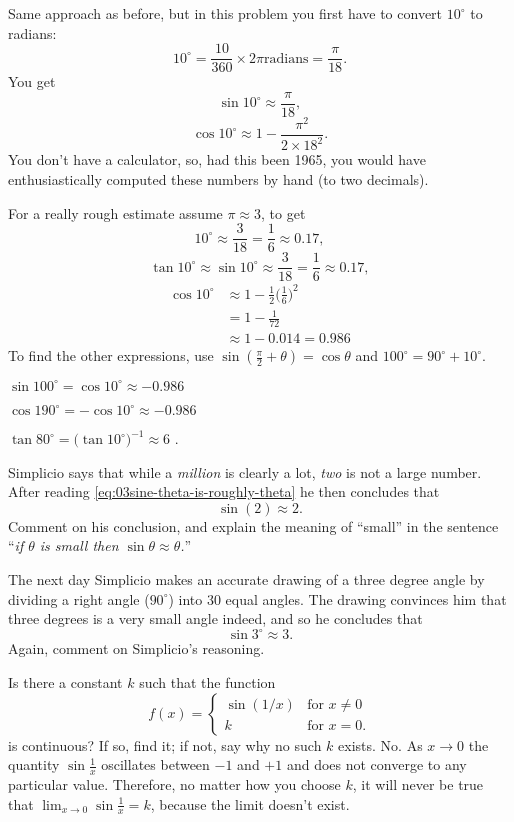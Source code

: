 \begin{multicols}{2}
\setcounter{SUBPROB}{0}
\answer
Same approach as before, but in this problem you first have to convert
$10^\circ$ to radians: 
\[
10^\circ = \frac{10}{360}\times2\pi \textrm{radians} = \frac{\pi}{18}.
\]
You get
\[
\sin 10^\circ \approx \frac{\pi}{18},
\]
\[
\cos 10^\circ \approx 1 - \frac{\pi^2}{2\times18^2}.
\]
You don't have a calculator, so, had this been 1965, you would have
enthusiastically computed these numbers by hand (to two decimals).

For a really rough estimate assume $\pi\approx3$, to get
\[
10^\circ \approx \frac{3}{18} = \frac{1}{6} \approx 0.17,
\]
\[
\tan 10^\circ \approx \sin 10^\circ \approx \frac{3}{18} = \frac{1}{6} \approx
0.17,
\]
\begin{align*}
  \cos 10^\circ &\approx 1 - \frac{1}{2} \bigl(\frac{1}{6}\bigr)^2\\
  &= 1- \frac{1}{72}\\
  &\approx 1-0.014 = 0.986
\end{align*}
To find the other expressions, use $\sin(\frac\pi2+\theta) =
\cos\theta$ and $100^\circ = 90^\circ + 10 ^\circ$.

$\sin 100^\circ = \cos10^\circ \approx -0.986 $

$\cos 190^\circ = -\cos 10^\circ \approx -0.986$

$\tan80^\circ = \bigl(\tan 10^\circ\bigr)^{-1} \approx 6$ .
\endanswer

\problem \subprob Simplicio says that while a \textit{million} is clearly a lot,
\textit{two} is not a large number.  After reading
\eqref{eq:03sine-theta-is-roughly-theta} he then concludes that
\[
\sin(2) \approx 2.
\]
Comment on his conclusion, and explain the meaning of ``small'' in
the sentence ``\textit{if $\theta$ is small then $\sin\theta \approx
\theta$.}''

\subprob The next day Simplicio makes an accurate drawing of a three
degree angle by dividing a right angle ($90^\circ$) into $30$ equal
angles.  The drawing convinces him that three degrees is a very small
angle indeed, and so he concludes that
\[
\sin 3^\circ \approx 3.
\]
Again, comment on Simplicio's reasoning.

\problem Is there a constant $k$ such that the function
\[
f(x)= \begin{cases}
  \sin(1/x) &\text{for }x\ne 0\\
  k & \text{for } x=0.
\end{cases}
\]
is continuous?  If so, find it; if not, say why no such $k$ exists.
\answer
No.  As \(x\to0\) the quantity \(\sin \frac{1}{x}\) oscillates
between \(-1\) and \(+1\) and does not converge to any particular
value.  Therefore, no matter how you choose \(k\), it will never be
true that \(\lim_{x\to 0} \sin \frac1x = k\), because the limit
doesn't exist.
\endanswer


\end{multicols}
